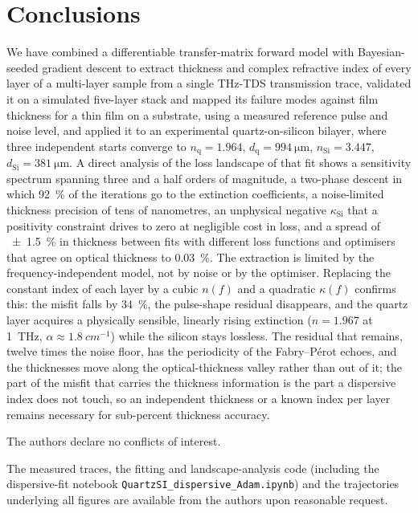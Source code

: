 \documentclass{optica-article}
\newcommand{\kap}{\kappa}
\begin{document}
\section{Conclusions}\label{sec:conclusions}
We have combined a differentiable transfer-matrix forward model with Bayesian-seeded gradient descent to extract thickness and complex refractive index of every layer of a multi-layer sample from a single THz-TDS transmission trace, validated it on a simulated five-layer stack and mapped its failure modes against film thickness for a thin film on a substrate, using a measured reference pulse and noise level, and applied it to an experimental quartz-on-silicon bilayer, where three independent starts converge to $n_{\mathrm{q}}=1.964$, $d_{\mathrm{q}}=\SI{994}{\micro\metre}$, $n_{\mathrm{Si}}=3.447$, $d_{\mathrm{Si}}=\SI{381}{\micro\metre}$. A direct analysis of the loss landscape of that fit shows a sensitivity spectrum spanning three and a half orders of magnitude, a two-phase descent in which \SI{92}{\percent} of the iterations go to the extinction coefficients, a noise-limited thickness precision of tens of nanometres, an unphysical negative $\kap_{\mathrm{Si}}$ that a positivity constraint drives to zero at negligible cost in loss, and a spread of \SI{\pm1.5}{\percent} in thickness between fits with different loss functions and optimisers that agree on optical thickness to \SI{0.03}{\percent}. The extraction is limited by the frequency-independent model, not by noise or by the optimiser. Replacing the constant index of each layer by a cubic $n(f)$ and a quadratic $\kap(f)$ confirms this: the misfit falls by \SI{34}{\percent}, the pulse-shape residual disappears, and the quartz layer acquires a physically sensible, linearly rising extinction ($n=1.967$ at \SI{1}{THz}, $\alpha\approx\SI{1.8}{cm^{-1}}$) while the silicon stays lossless. The residual that remains, twelve times the noise floor, has the periodicity of the Fabry--P\'erot echoes, and the thicknesses move along the optical-thickness valley rather than out of it; the part of the misfit that carries the thickness information is the part a dispersive index does not touch, so an independent thickness or a known index per layer remains necessary for sub-percent thickness accuracy.


\begin{backmatter}
 \todo{[to be added]}

 \todo{[to be added]}

 The authors declare no conflicts of interest. 

 The measured traces, the fitting and landscape-analysis code (including the dispersive-fit notebook \texttt{QuartzSI\_\-dispersive\_\-Adam.ipynb}) and the trajectories underlying all figures are available from the authors upon reasonable request. 
\end{backmatter}


\end{document}
